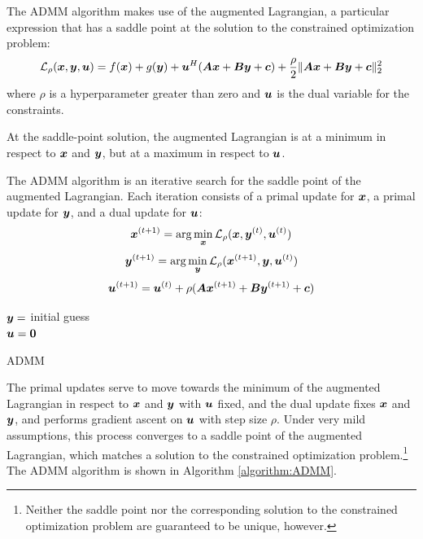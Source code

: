 The ADMM algorithm makes use of the augmented Lagrangian, a particular expression that has a saddle point at the solution to the constrained optimization problem:
%
\begin{equation}
\mathcal{L}_{\rho}(\bm{x},\bm{y},\bm{u}) = f(\bm{x}) + g(\bm{y}) + \bm{u}^H(\bm{A}\bm{x} + \bm{B}\bm{y} + \bm{c}) + \frac{\rho}{2}\|\bm{A}\bm{x} + \bm{B}\bm{y} + \bm{c}\|_2^2
\end{equation}
%
where $\rho$ is a hyperparameter greater than zero and $\bm{u}$ is the dual variable for the constraints.

At the saddle-point solution, the augmented Lagrangian is at a minimum in respect to $\bm{x}$ and $\bm{y}$, but at a maximum in respect to $\bm{u}$.

The ADMM algorithm is an iterative search for the saddle point of the augmented Lagrangian. Each iteration consists of a primal update for $\bm{x}$, a primal update for $\bm{y}$, and a dual update for $\bm{u}$:
%
\begin{equation}
\bm{x}^{(t + 1)} = \arg\min_{\bm{x}} \mathcal{L}_{\rho}(\bm{x},\bm{y}^{(t)},\bm{u}^{(t)})
\end{equation}
%
\begin{equation}
\bm{y}^{(t + 1)} = \arg\min_{\bm{y}} \mathcal{L}_{\rho}(\bm{x}^{(t + 1)},\bm{y},\bm{u}^{(t)})
\end{equation}
%
\begin{equation} \label{equation:general dual update}
\bm{u}^{(t + 1)} = \bm{u}^{(t)} + \rho(\bm{A}\bm{x}^{(t + 1)} + \bm{B}\bm{y}^{(t + 1)} + \bm{c})
\end{equation}
%
\begin{algorithm}[H] \label{algorithm:ADMM}
\SetAlgoLined
   $\bm{y} = $ initial guess \\
   $\bm{u} = \bm{0}$ \\
 \caption{ADMM}
\end{algorithm}

The primal updates serve to move towards the minimum of the augmented Lagrangian in respect to $\bm{x}$ and $\bm{y}$ with $\bm{u}$ fixed, and the dual update fixes $\bm{x}$ and $\bm{y}$, and performs gradient ascent on $\bm{u}$ with step size $\rho$. Under very mild assumptions, this process converges to a saddle point of the augmented Lagrangian, which matches a solution to the constrained optimization problem.\footnote{Neither the saddle point nor the corresponding solution to the constrained optimization problem are guaranteed to be unique, however.} The ADMM algorithm is shown in Algorithm \ref{algorithm:ADMM}.

